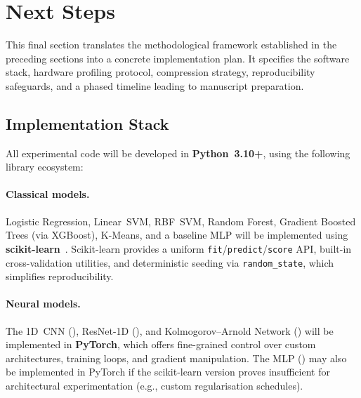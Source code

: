 
\section{Next Steps}\label{sec:nextsteps}

This final section translates the methodological framework established
in the preceding sections into a concrete implementation plan.  It
specifies the software stack, hardware profiling protocol, compression
strategy, reproducibility safeguards, and a phased timeline leading to
manuscript preparation.


\subsection{Implementation Stack}
\label{subsec:impl_stack}

All experimental code will be developed in \textbf{Python~3.10+},
using the following library ecosystem:

\paragraph{Classical models.}
Logistic Regression, Linear~SVM, RBF~SVM, Random Forest, Gradient
Boosted Trees (via XGBoost), K-Means, and a baseline MLP will be
implemented using
\textbf{scikit-learn}~\cite{sklearn_docs}.  Scikit-learn provides a
uniform \texttt{fit}/\texttt{predict}/\texttt{score} API, built-in
cross-validation utilities, and deterministic seeding via
\texttt{random\_state}, which simplifies reproducibility.

\paragraph{Neural models.}
The 1D~CNN (), ResNet-1D (),
and Kolmogorov--Arnold Network () will be implemented
in \textbf{PyTorch}, which offers fine-grained control over custom
architectures, training loops, and gradient manipulation.  The MLP
() may also be implemented in PyTorch if the
scikit-learn version proves insufficient for architectural
experimentation (e.g., custom regularisation schedules).

